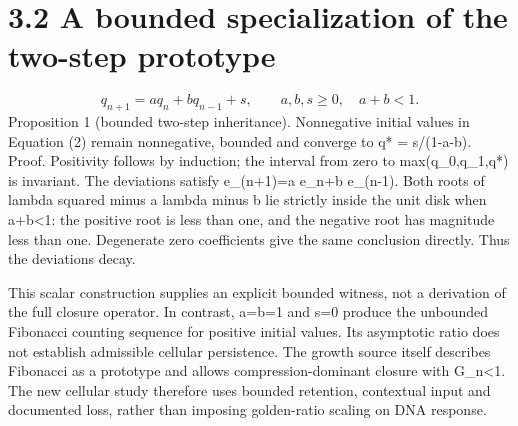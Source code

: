 \documentclass[11pt,a4paper]{article}
\begin{document}
\section*{3.2 A bounded specialization of the two-step prototype}
\begin{equation}q_{n+1}=a q_n+b q_{n-1}+s,\qquad a,b,s\ge0,\quad a+b<1.\tag{2}\end{equation}
Proposition 1 (bounded two-step inheritance). Nonnegative initial values in Equation (2) remain nonnegative, bounded and converge to q* = s/(1-a-b). Proof. Positivity follows by induction; the interval from zero to max(q\_0,q\_1,q*) is invariant. The deviations satisfy e\_(n+1)=a e\_n+b e\_(n-1). Both roots of lambda squared minus a lambda minus b lie strictly inside the unit disk when a+b<1: the positive root is less than one, and the negative root has magnitude less than one. Degenerate zero coefficients give the same conclusion directly. Thus the deviations decay.

This scalar construction supplies an explicit bounded witness, not a derivation of the full closure operator. In contrast, a=b=1 and s=0 produce the unbounded Fibonacci counting sequence for positive initial values. Its asymptotic ratio does not establish admissible cellular persistence. The growth source itself describes Fibonacci as a prototype and allows compression-dominant closure with G\_n<1. The new cellular study therefore uses bounded retention, contextual input and documented loss, rather than imposing golden-ratio scaling on DNA response.
\end{document}
